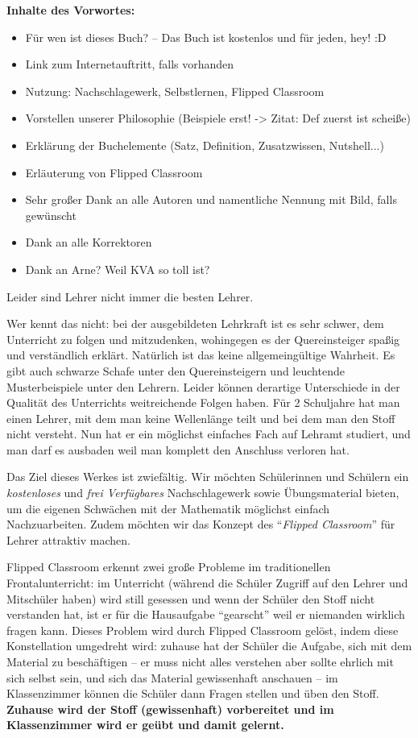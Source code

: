 \documentclass[../main.tex]{subfiles}
\begin{document}
\textbf{Inhalte des Vorwortes:}
\begin{itemize}
    \item Für wen ist dieses Buch? -- Das Buch ist kostenlos und für jeden, hey! :D
    \item Link zum Internetauftritt, falls vorhanden
    \item Nutzung: Nachschlagewerk, Selbstlernen, Flipped Classroom
    \item Vorstellen unserer Philosophie (Beispiele erst! -> Zitat: Def zuerst ist scheiße)
    \item Erklärung der Buchelemente (Satz, Definition, Zusatzwissen, Nutshell...)
    \item Erläuterung von Flipped Classroom
    \item Sehr großer Dank an alle Autoren und namentliche Nennung mit Bild, falls gewünscht
    \item Dank an alle Korrektoren
    \item Dank an Arne? Weil KVA so toll ist?
\end{itemize}
\fi

Leider sind Lehrer nicht immer die besten Lehrer.

Wer kennt das nicht: bei der ausgebildeten Lehrkraft ist es sehr schwer, dem Unterricht zu folgen und mitzudenken, wohingegen es der Quereinsteiger spaßig und verständlich erklärt. Natürlich ist das keine allgemeingültige Wahrheit. Es gibt auch schwarze Schafe unter den Quereinsteigern und leuchtende Musterbeispiele unter den Lehrern. Leider können derartige Unterschiede in der Qualität des Unterrichts weitreichende Folgen haben. Für 2 Schuljahre hat man einen Lehrer, mit dem man keine Wellenlänge teilt und bei dem man den Stoff nicht versteht. Nun hat er ein möglichst einfaches Fach auf Lehramt studiert, und man darf es ausbaden weil man komplett den Anschluss verloren hat.

Das Ziel dieses Werkes ist zwiefältig. Wir möchten Schülerinnen und Schülern ein \emph{kostenloses} und \emph{frei Verfügbares} Nachschlagewerk sowie Übungsmaterial bieten, um die eigenen Schwächen mit der Mathematik möglichst einfach Nachzuarbeiten. Zudem möchten wir das Konzept des \enquote{\emph{Flipped Classroom}} für Lehrer attraktiv machen.

Flipped Classroom erkennt zwei große Probleme im traditionellen Frontalunterricht: im Unterricht (während die Schüler Zugriff auf den Lehrer und Mitschüler haben) wird still gesessen und wenn der Schüler den Stoff nicht verstanden hat, ist er für die Hausaufgabe \enquote{gearscht} weil er niemanden wirklich fragen kann.
Dieses Problem wird durch Flipped Classroom gelöst, indem diese Konstellation umgedreht wird: zuhause hat der Schüler die Aufgabe, sich mit dem Material zu beschäftigen -- er muss nicht alles verstehen aber sollte ehrlich mit sich selbst sein, und sich das Material gewissenhaft anschauen -- im Klassenzimmer können die Schüler dann Fragen stellen und üben den Stoff. \textbf{Zuhause wird der Stoff (gewissenhaft) vorbereitet und im Klassenzimmer wird er geübt und damit gelernt.}
\end{document}

